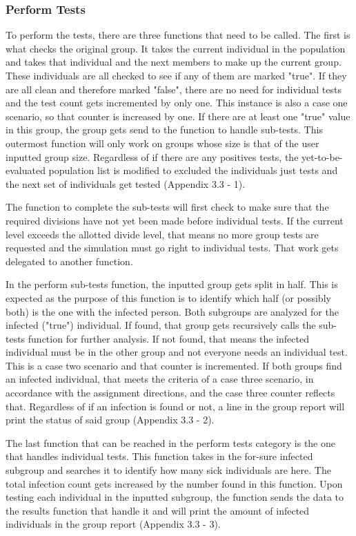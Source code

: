 \documentclass[letterpaper, 10pt,DIV=13]{scrartcl}
\numberwithin{equation}{section} %
\numberwithin{figure}{section} %
\numberwithin{table}{section} %
\begin{document}
\subsubsection{Perform Tests}
 To perform the tests, there are three functions that need to be called.  The first is what checks the original group.  It takes the current individual in the population and takes that individual and the next members to make up the current group.  These individuals are all checked to see if any of them are marked "true".  If they are all clean and therefore marked "false", there are no need for individual tests and the test count gets incremented by only one.  This instance is also a case one scenario, so that counter is increased by one.  If there are at least one "true" value in this group, the group gets send to the function to handle sub-tests.  This outermost function will only work on groups whose size is that of the user inputted group size.  Regardless of if there are any positives tests, the yet-to-be-evaluated population list is modified to excluded the individuals just tests and the next set of individuals get tested (Appendix 3.3 - 1).
 
 The function to complete the sub-tests will first check to make sure that the required divisions have not yet been made before individual tests.  If the current level exceeds the allotted divide level, that means no more group tests are requested and the simulation must go right to individual tests.  That work gets delegated to another function.  
 
 In the perform sub-tests function, the inputted group gets split in half.  This is expected as the purpose of this function is to identify which half (or possibly both) is the one with the infected person.  Both subgroups are analyzed for the infected ("true") individual.  If found, that group gets recursively calls the sub-tests function for further analysis.  If not found, that means the infected individual must be in the other group and not everyone needs an individual test.  This is a case two scenario and that counter is incremented.  If both groups find an infected individual, that meets the criteria of a case three scenario, in accordance with the assignment directions, and the case three counter reflects that.  Regardless of if an infection is found or not, a line in the group report will print the status of said group (Appendix 3.3 - 2).
 
 The last function that can be reached in the perform tests category is the one that handles individual tests.  This function takes in the for-sure infected subgroup and searches it to identify how many sick individuals are here.  The total infection count gets increased by the number found in this function.  Upon testing each individual in the inputted subgroup, the function sends the data to the results function that handle it and will print the amount of infected individuals in the group report (Appendix 3.3 - 3).
\end{document}
